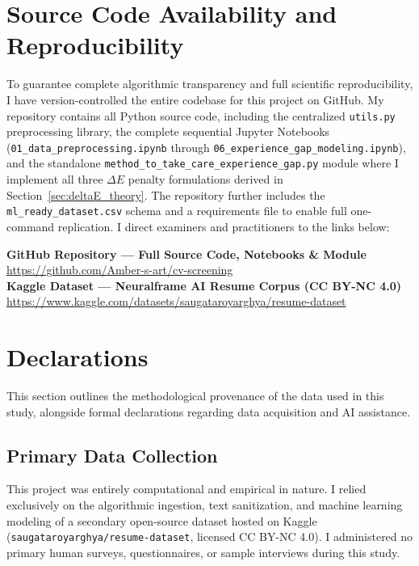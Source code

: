 \section{Source Code Availability and Reproducibility}
\label{sec:appendix_code}

To guarantee complete algorithmic transparency and full scientific reproducibility, I have version-controlled the entire codebase for this project on GitHub. My repository contains all Python source code, including the centralized \texttt{utils.py} preprocessing library, the complete sequential Jupyter Notebooks (\texttt{01\_data\_preprocessing.ipynb} through \texttt{06\_experience\_gap\_modeling.ipynb}), and the standalone \texttt{method\_to\_take\_care\_experience\_gap.py} module where I implement all three $\Delta E$ penalty formulations derived in Section~\ref{sec:deltaE_theory}. The repository further includes the \texttt{ml\_ready\_dataset.csv} schema and a requirements file to enable full one-command replication. I direct examiners and practitioners to the links below:

\begin{tcolorbox}[
  colback=softblue, colframe=navyblue, arc=4pt, boxrule=1pt,
  left=12pt, right=12pt, top=10pt, bottom=10pt
]
\textbf{\color{navyblue}GitHub Repository --- Full Source Code, Notebooks \& Module}\\[4pt]
\url{https://github.com/Amber-s-art/cv-screening}\\[8pt]
\textbf{\color{navyblue}Kaggle Dataset --- Neuralframe AI Resume Corpus (CC BY-NC 4.0)}\\[4pt]
\url{https://www.kaggle.com/datasets/saugataroyarghya/resume-dataset}
\end{tcolorbox}

\section{Declarations}
\label{sec:appendix_declarations}

This section outlines the methodological provenance of the data used in this study, alongside formal declarations regarding data acquisition and AI assistance.

\subsection*{Primary Data Collection}
This project was entirely computational and empirical in nature. I relied exclusively on the algorithmic ingestion, text sanitization, and machine learning modeling of a secondary open-source dataset hosted on Kaggle (\texttt{saugataroyarghya/resume-dataset}, licensed CC BY-NC 4.0). I administered no primary human surveys, questionnaires, or sample interviews during this study.


